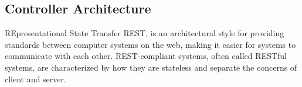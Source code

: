 
\subsection{Controller Architecture}
REpresentational State Transfer \ac{REST}, is an architectural style for providing standards between computer systems on the web, making it easier for systems to communicate with each other. REST-compliant systems, often called RESTful systems, are characterized by how they are stateless and separate the concerns of client and server.


